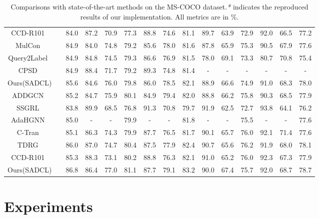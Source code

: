 \documentclass{ecai}
\begin{document}
\begin{table*}[!ht]
{{\begin{tabular}{c|c|c| cccccc | cccccc }
			CCD-R101~\cite{liu2022contextual}&  & 84.0 & 87.2 & 70.9 & 77.3 & 88.8 & 74.6 & 81.1 & 89.7 & 63.9 & 72.9 & 92.0 & 66.5 & 77.2 \\
MulCon~\cite{dao2021multi}       &  & 84.9 & 84.0 & 74.8 & 79.2 & 85.6 & 78.0 & 81.6 & 87.8 & 65.9 & 75.3 & 90.5 & 67.9 & 77.6 \\ 
			Query2Label~\cite{liu2021q2l}    &  & 84.9 & 84.8 & 74.5 & 79.3 & 86.6 & 76.9 & 81.5 & 78.0 & 69.1 & 73.3 & 80.7 & 70.8 & 75.4 \\
			CPSD~\cite{huang2022cpsd}        &  & 84.9 & 88.4 & 71.7 & 79.2 & 89.3 & 74.8 & 81.4 & -    & -    & -    & -    & -    & -    \\
\hline
\rowcolor{iyellow}Ours(SADCL)      &  & 85.6 & 84.6 & 76.0 & 79.8 & 86.0 & 78.5 & 82.1 & 88.9 & 66.6 & 74.9 & 91.0 & 68.3 & 78.0 \\	\hline \hline
			ADDGCN~\cite{ye2020attention}    &  & 85.2 & 84.7 & 75.9 & 80.1 & 84.9 & 79.4 & 82.0 & 88.8 & 66.2 & 75.8 & 90.3 & 68.5 & 77.9 \\
			SSGRL~\cite{Chen2019ICCV}        &  & 83.8 & 89.9 & 68.5 & 76.8 & 91.3 & 70.8 & 79.7 & 91.9 & 62.5 & 72.7 & 93.8 & 64.1 & 76.2 \\
			AdaHGNN~\cite{wu2020adahgnn}     &  & 85.0 &  -   & -    & 79.9 &  -   &   -  & 81.8 &   -  &  -   & 75.5 &  -   &  -   & 77.6 \\
			C-Tran~\cite{Tianlu2021Ctran}    &  & 85.1 & 86.3 & 74.3 & 79.9 & 87.7 & 76.5 & 81.7 & 90.1 & 65.7 & 76.0 & 92.1 & 71.4 & 77.6 \\
			TDRG~\cite{Zhao2021ICCV}         &  & 86.0 & 87.0 & 74.7 & 80.4 & 87.5 & 77.9 & 82.4 & 90.7 & 65.6 & 76.2 & 91.9 & 68.0 & 78.1 \\
			CCD-R101~\cite{liu2022contextual}&  & 85.3 & 88.3 & 73.1 & 80.2 & 88.8 & 76.3 & 82.1 & 91.0 & 65.2 & 76.0 & 92.3 & 67.3 & 77.9 \\    \hline 
			\rowcolor{iyellow}Ours(SADCL)      &  & 86.8 & 86.4 & 77.0 & 81.1 & 87.7 & 79.1 & 83.2 & 90.0 & 67.4 & 75.7 & 92.0 & 68.7 & 78.7 \\	\hline
			
\end{tabular}
		}
		\caption{Comparisons with state-of-the-art methods on the MS-COCO dataset.\emph{*} indicates the reproduced results of our implementation. All metrics are in \%.}
		\label{table: COCO benchmark}
	}
\end{table*} \section{Experiments}
\end{document}
